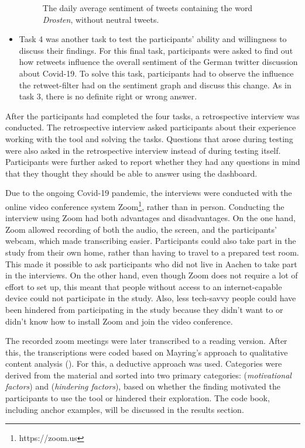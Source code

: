 \begin{itemize}
\begin{figure}[htb]
        \caption{The daily average sentiment of tweets containing the word \emph{Drosten}, without neutral tweets.}
        \label{fig:sentiment_drosten_noneutral}
    \end{figure}
    \item Task 4 was another task to test the participants' ability and willingness to discuss their findings.
    For this final task, participants were asked to find out how retweets influence the overall sentiment of the German twitter discussion about Covid-19. To solve this task, participants had to observe the influence the retweet-filter had on the sentiment graph and discuss this change. As in task 3, there is no definite right or wrong answer.
\end{itemize}

After the participants had completed the four tasks, a retrospective interview was conducted. The retrospective interview asked participants about their experience working with the tool and solving the tasks. Questions that arose during testing were also asked in the retrospective interview instead of during testing itself. Participants were further asked to report whether they had any questions in mind that they thought they should be able to answer using the dashboard.

Due to the ongoing Covid-19 pandemic, the interviews were conducted with the online video conference system Zoom\footnote{https://zoom.us}, rather than in person. Conducting the interview using Zoom had both advantages and disadvantages. On the one hand, Zoom allowed recording of both the audio, the screen, and the participants' webcam, which made transcribing easier. Participants could also take part in the study from their own home, rather than having to travel to a prepared test room. This made it possible to ask participants who did not live in Aachen to take part in the interviews.
On the other hand, even though Zoom does not require a lot of effort to set up, this meant that people without access to an internet-capable device could not participate in the study. Also, less tech-savvy people could have been hindered from participating in the study because they didn't want to or didn't know how to install Zoom and join the video conference.

The recorded zoom meetings were later transcribed to a reading version. After this, the transcriptions were coded based on Mayring's approach to qualitative content analysis (\cite{mayring2010qualitative}). For this, a deductive approach was used. Categories were derived from the material and sorted into two primary categories:  (\emph{motivational factors}) and  (\emph{hindering factors}), based on whether the finding motivated the participants to use the tool or hindered their exploration. The code book, including anchor examples, will be discussed in the results section. 

